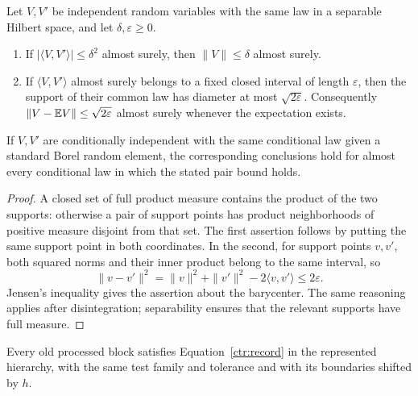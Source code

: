 \begin{lemma}\label{ct:support}
Let $V,V'$ be independent random variables with the same law in a
separable Hilbert space, and let $\delta,\varepsilon\ge0$.
\begin{enumerate}
\item If $|\langle V,V'\rangle|\le\delta^2$ almost surely, then
      $\|V\|\le\delta$ almost surely.
\item If $\langle V,V'\rangle$ almost surely belongs to a fixed closed
      interval of length $\varepsilon$, then the support of their
      common law has diameter at most $\sqrt{2\varepsilon}$.  Consequently
      $\|V-\mathbb E V\|\le\sqrt{2\varepsilon}$ almost surely whenever
      the expectation exists.
\end{enumerate}
If $V,V'$ are conditionally independent with the same conditional law
given a standard Borel random element, the corresponding conclusions
hold for almost every conditional law in which the stated pair bound holds.
\end{lemma}

\begin{proof}
A closed set of full product measure contains the product of the
two supports: otherwise a pair of support points has product
neighborhoods of positive measure disjoint from that set.
The first assertion follows by putting the same support point in
both coordinates.  In the second, for support points $v,v'$, both
squared norms and their inner product belong to the same interval,
so
\[
 \|v-v'\|^2=\|v\|^2+\|v'\|^2-2\langle v,v'\rangle
                              \le2\varepsilon.
\]
Jensen's inequality gives the assertion about the barycenter.
The same reasoning applies after disintegration; separability
ensures that the relevant supports have full measure.
\end{proof}

\begin{lemma}\label{ct:old-records}
Every old processed block satisfies Equation~\eqref{ctr:record}
in the represented hierarchy, with the same test family and
tolerance and with its boundaries shifted by $h$.
\end{lemma}

